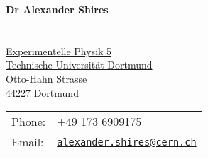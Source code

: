 \documentclass[10pt]{article}
\def\tud{Technische Universit\"at Dortmund}
\def\name{Dr Alexander Shires}
\providecommand*\email[1]{\href{mailto:#1}{#1}}
\renewcommand*\email[1]{\href{mailto:#1}{\texttt{#1}}}
\begin{document}
\centerline{\Large \bf \name}

\section*{\quad}

\begin{minipage}{0.50\linewidth}
  \href{http://www.e5.physik.uni-dortmund.de}{Experimentelle Physik 5} \\
  \href{http://www.uni-dortmund.de}{\tud} \\
  Otto-Hahn Strasse \\
  44227 Dortmund 
\end{minipage}
\begin{minipage}{0.50\linewidth}
  \begin{tabular}{ll}
    Phone: & +49 173 6909175 \\
    Email: & \email{alexander.shires@cern.ch}\\
  \end{tabular}
\end{minipage}

\end{document}
